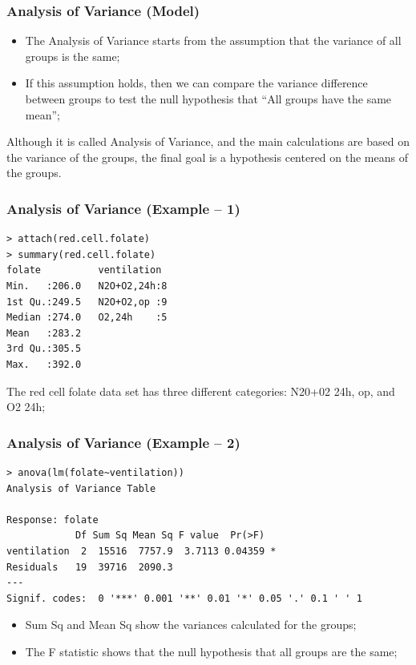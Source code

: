 \documentclass[10pt]{beamer}
\begin{document}
\begin{frame}
  \frametitle{Analysis of Variance (Model)}
  \begin{itemize} 
  \item The Analysis of Variance starts from the assumption that
    the variance of all groups is the same;
  \item If this assumption holds, then we can compare the variance
    difference between groups to test the null hypothesis that
    ``All groups have the same mean'';
  \end{itemize}
  \begin{block}{}
    Although it is called Analysis of Variance, and the main
    calculations are based on the variance of the groups, the final
    goal is a hypothesis centered on the means of the groups.
  \end{block}
\end{frame}

\begin{frame}
  \frametitle{Analysis of Variance (Example -- 1)}
{\small
  \begin{block}{}
\begin{verbatim}
> attach(red.cell.folate)
> summary(red.cell.folate)
folate          ventilation
Min.   :206.0   N2O+O2,24h:8   
1st Qu.:249.5   N2O+O2,op :9   
Median :274.0   O2,24h    :5   
Mean   :283.2                  
3rd Qu.:305.5                  
Max.   :392.0
\end{verbatim}
  \end{block}}

The red cell folate data set has three different categories: N20+02 24h, op, and O2 24h;

\end{frame}

\begin{frame}
  \frametitle{Analysis of Variance (Example -- 2)}
{\small
  \begin{block}{}
\begin{verbatim}
> anova(lm(folate~ventilation))
Analysis of Variance Table

Response: folate
            Df Sum Sq Mean Sq F value  Pr(>F)  
ventilation  2  15516  7757.9  3.7113 0.04359 *
Residuals   19  39716  2090.3                  
---
Signif. codes:  0 '***' 0.001 '**' 0.01 '*' 0.05 '.' 0.1 ' ' 1
\end{verbatim}
  \end{block}}
\begin{itemize}
  \item Sum Sq and Mean Sq show the variances calculated for the
    groups;
  \item The F statistic shows that the null hypothesis that all groups
    are the same;
\end{itemize}
\end{frame}
\end{document}
